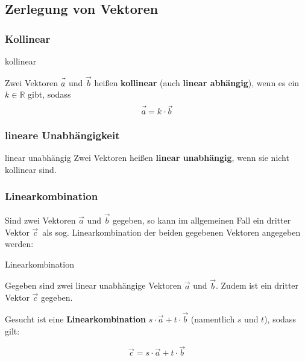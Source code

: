 \subsection{Zerlegung von Vektoren}

\subsubsection{Kollinear}

\begin{definition}{kollinear}{}\label{linearkombination}

  Zwei Vektoren $\vec{a\vphantom{b}}$ und $\vec{b}$ heißen
  \textbf{kollinear} (auch \textbf{linear abhängig}), wenn es ein
  $k\in\mathbb{R}$ gibt, sodass
  $$\vec{a\vphantom{b}} = k\cdot{}\vec{b}$$
\end{definition}

\subsubsection{lineare Unabhängigkeit}
\begin{definition}{linear unabhängig}{}
Zwei Vektoren heißen \textbf{linear unabhängig}, wenn sie nicht
kollinear sind.
\end{definition}

\subsubsection{Linearkombination}
Sind zwei Vektoren $\vec{a}$ und $\vec{b}$ gegeben, so kann im
allgemeinen Fall ein
dritter Vektor $\vec{c}$\, als sog. Linearkombination der beiden
gegebenen Vektoren angegeben werden:

\begin{gesetz}{Linearkombination}{}

  Gegeben sind zwei linear unabhängige Vektoren $\vec{a}$ und
  $\vec{b}$. Zudem ist ein dritter Vektor $\vec{c}$ gegeben.

  Gesucht ist eine \textbf{Linearkombination} $s\cdot{}\vec{a} +
  t\cdot{}\vec{b}$ (namentlich $s$ und $t$), sodass gilt:

  $$\vec{c} = s\cdot{}\vec{a} + t\cdot{}\vec{b}$$
\end{gesetz}
\newpage


